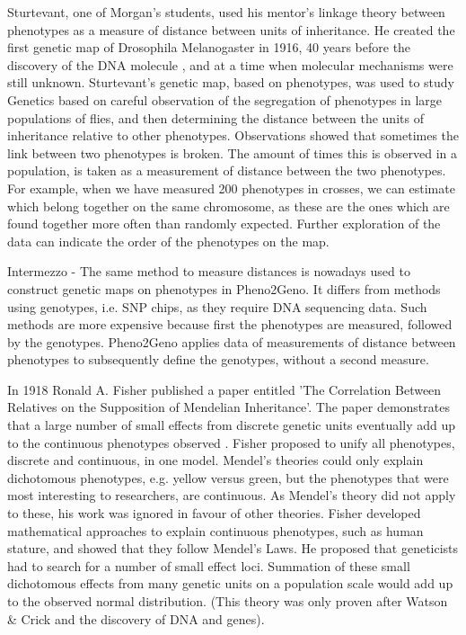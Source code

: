 Sturtevant, one of Morgan's students, used his mentor's linkage theory between phenotypes as a measure of distance 
between units of inheritance. He created the first genetic map of Drosophila Melanogaster in 1916, 40 years before 
the discovery of the DNA molecule \cite{Morgan:1916}, and at a time when molecular mechanisms were still unknown. 
Sturtevant's genetic map, based on phenotypes, was used to study Genetics based on careful observation of the 
segregation of phenotypes in large populations of flies, and then determining the distance between the units of 
inheritance relative to other phenotypes. Observations showed that sometimes the link between two phenotypes is 
broken. The amount of times this is observed in a population, is taken as a measurement of distance between the 
two phenotypes. For example, when we have measured 200 phenotypes in crosses, we can estimate which belong together 
on the same chromosome, as these are the ones which are found together more often than randomly expected. Further 
exploration of the data can indicate the order of the phenotypes on the map.

Intermezzo - The same method to measure distances is nowadays used to construct genetic maps on phenotypes in Pheno2Geno. 
It differs from methods using genotypes, i.e. SNP chips, as they require DNA sequencing data. Such methods are more 
expensive because first the phenotypes are measured, followed by the genotypes. Pheno2Geno applies data of measurements 
of distance between phenotypes to subsequently define the genotypes, without a second measure.  

In 1918 Ronald A. Fisher published a paper entitled 'The Correlation Between Relatives on the Supposition of 
Mendelian Inheritance'. The paper demonstrates that a large number of small effects from discrete genetic 
units eventually add up to the continuous phenotypes observed \cite{Fisher:1918}. Fisher proposed to unify all 
phenotypes, discrete and continuous, in one model. Mendel's theories could only explain dichotomous phenotypes, 
e.g. yellow versus green, but the phenotypes that were most interesting to researchers, are continuous. As 
Mendel's theory did not apply to these, his work was ignored in favour of other theories. Fisher developed 
mathematical approaches to explain continuous phenotypes, such as human stature, and showed that they follow 
Mendel's Laws. He proposed that geneticists had to search for a number of small effect loci. Summation of 
these small dichotomous effects from many genetic units on a population scale would add up to the observed 
normal distribution. (This theory was only proven after Watson \& Crick and the discovery of DNA and genes).

